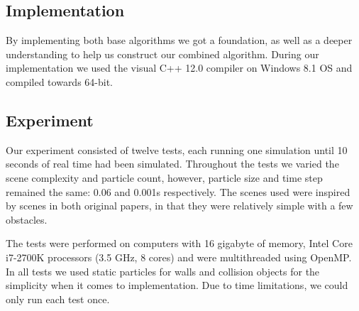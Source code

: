 \documentclass[../../main.tex]{subfiles}
\begin{document}
\subsection{Implementation}

By implementing both base algorithms we got a foundation, as well as a deeper understanding to help us construct our combined algorithm. During our implementation we used the visual C++ 12.0 compiler on Windows 8.1 OS and compiled towards 64-bit. 


\subsection{Experiment}

Our experiment consisted of twelve tests, each running one simulation until 10 seconds of real time had been simulated. Throughout the tests we varied the scene complexity and particle count, however, particle size and time step remained the same: 0.06 and 0.001s respectively. The scenes used were inspired by scenes in both original papers, in that they were relatively simple with a few obstacles. 

The tests were performed on computers with 16 gigabyte of memory, Intel Core i7-2700K processors (3.5 GHz, 8 cores) and were multithreaded using OpenMP. In all tests we used static particles for walls and collision objects for the simplicity when it comes to implementation. Due to time limitations, we could only run each test once. 
\end{document}
